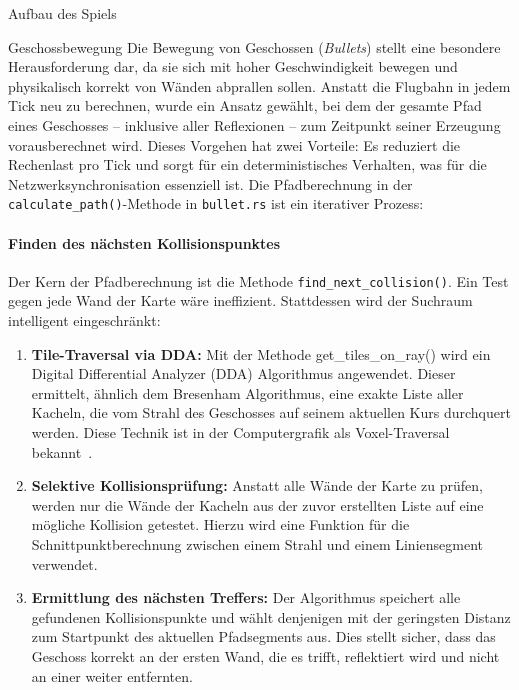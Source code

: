 \begin{section}{Aufbau des Spiels}
\begin{subsection}{Geschossbewegung}
Die Bewegung von Geschossen (\textit{Bullets}) stellt eine besondere Herausforderung dar, da sie sich mit hoher Geschwindigkeit bewegen und physikalisch korrekt von Wänden abprallen sollen.
Anstatt die Flugbahn in jedem Tick neu zu berechnen, wurde ein Ansatz gewählt, bei dem der gesamte Pfad eines Geschosses -- inklusive aller Reflexionen -- zum Zeitpunkt seiner Erzeugung vorausberechnet wird.
Dieses Vorgehen hat zwei Vorteile: Es reduziert die Rechenlast pro Tick und sorgt für ein deterministisches Verhalten, was für die Netzwerksynchronisation essenziell ist.
Die Pfadberechnung in der \texttt{calculate\_path()}-Methode in \texttt{bullet.rs} ist ein iterativer Prozess:

\paragraph{Finden des nächsten Kollisionspunktes}
Der Kern der Pfadberechnung ist die Methode \texttt{find\_next\_collision()}.
Ein Test gegen jede Wand der Karte wäre ineffizient.
Stattdessen wird der Suchraum intelligent eingeschränkt:
\begin{enumerate}
    \item \textbf{Tile-Traversal via DDA:} Mit der Methode get\_tiles\_on\_ray() wird ein Digital Differential Analyzer (DDA) Algorithmus angewendet. Dieser ermittelt, ähnlich dem Bresenham Algorithmus, eine exakte Liste aller Kacheln, die vom Strahl des Geschosses auf seinem aktuellen Kurs durchquert werden. Diese Technik ist in der Computergrafik als Voxel-Traversal bekannt~\cite{amanatides1987fast}.
    \item \textbf{Selektive Kollisionsprüfung:} Anstatt alle Wände der Karte zu prüfen, werden nur die Wände der Kacheln aus der zuvor erstellten Liste auf eine mögliche Kollision getestet.
    Hierzu wird eine Funktion für die Schnittpunktberechnung zwischen einem Strahl und einem Liniensegment verwendet.
    \item \textbf{Ermittlung des nächsten Treffers:} Der Algorithmus speichert alle gefundenen Kollisionspunkte und wählt denjenigen mit der geringsten Distanz zum Startpunkt des aktuellen Pfadsegments aus.
    Dies stellt sicher, dass das Geschoss korrekt an der ersten Wand, die es trifft, reflektiert wird und nicht an einer weiter entfernten.
\end{enumerate}


\end{subsection}
\end{section}
